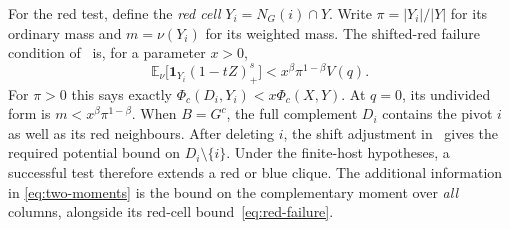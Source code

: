 For the red test, define the \emph{red cell}
$Y_i=N_G(i)\cap Y$. Write $\pi=|Y_i|/|Y|$ for its ordinary mass and
$m=\nu(Y_i)$ for its weighted mass. The shifted-red failure condition
of~\cite[Section~3.3, equation~(3)]{ZBS} is, for a parameter $x>0$,
\begin{equation}\label{eq:red-failure}
 \mathbb E_\nu\bigl[\mathbf1_{Y_i}(1-tZ)_+^s\bigr]
   <x^\beta\pi^{1-\beta}V(q).
\end{equation}
For $\pi>0$ this says exactly
$\Phi_c(D_i,Y_i)<x\Phi_c(X,Y)$.
At $q=0$, its undivided form is $m<x^\beta\pi^{1-\beta}$.
When $B=G^c$, the full complement $D_i$ contains the pivot $i$ as well
as its red neighbours. After deleting $i$, the shift adjustment
in~\cite[Lemma~4.5]{ZBS} gives the required potential bound on
$D_i\setminus\{i\}$. Under the finite-host hypotheses, a successful
test therefore extends a red or blue clique. The additional information in
\eqref{eq:two-moments} is the bound on the complementary moment over
\emph{all} columns, alongside its red-cell bound~\eqref{eq:red-failure}.
